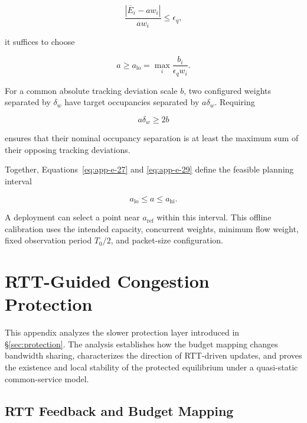 \begin{equation}
\label{eq:app-e-28}
\frac{|\overline E_i-aw_i|}{aw_i}\le\epsilon_q,
\end{equation}

it suffices to choose

\begin{equation}
\label{eq:app-e-29}
\boxed{
a\ge a_{\mathrm{lo}}
=
\max_i\frac{b_i}{\epsilon_qw_i}.
}
\end{equation}

For a common absolute tracking deviation scale \(b\), two configured weights separated by \(\delta_w\) have target occupancies separated by \(a\delta_w\). Requiring

\begin{equation}
\label{eq:app-e-30}
a\delta_w\ge2b
\end{equation}

ensures that their nominal occupancy separation is at least the maximum sum of their opposing tracking deviations.

Together, Equations~\eqref{eq:app-e-27} and \eqref{eq:app-e-29} define the feasible planning interval

\begin{equation}
\label{eq:app-e-31}
a_{\mathrm{lo}}\le a\le a_{\mathrm{hi}}.
\end{equation}

A deployment can select a point near \(a_{\mathrm{ref}}\) within this interval. This offline calibration uses the intended capacity, concurrent weights, minimum flow weight, fixed observation period \(T_0/2\), and packet-size configuration.


\section{RTT-Guided Congestion Protection}
\label{app:f}

This appendix analyzes the slower protection layer introduced in \S\ref{sec:protection}. The analysis establishes how the budget mapping changes bandwidth sharing, characterizes the direction of RTT-driven updates, and proves the existence and local stability of the protected equilibrium under a quasi-static common-service model.

\subsection{RTT Feedback and Budget Mapping}
\label{app:f-1}

